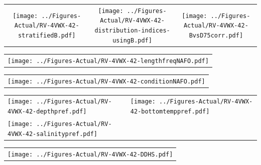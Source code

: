 \documentclass[12pt]{article}\usepackage[]{graphicx}\usepackage[]{color}
\begin{document}
\vspace{1cm}
\begin{minipage}{1.0\textwidth}
 \begin{tabular}{ccc}
\texttt{[image: ../Figures-Actual/RV-4VWX-42-stratifiedB.pdf]} & 
\texttt{[image: ../Figures-Actual/RV-4VWX-42-distribution-indices-usingB.pdf]} & 
\texttt{[image: ../Figures-Actual/RV-4VWX-42-BvsD75corr.pdf]} \\ 
\end{tabular} 
\end{minipage}
\clearpage
\begin{minipage}{1.0\textwidth}
 \begin{tabular}{c}
\texttt{[image: ../Figures-Actual/RV-4VWX-42-lengthfreqNAFO.pdf]} \\ 
\end{tabular} 
\end{minipage}
\newline

\vspace{1cm}
\begin{minipage}{1.0\textwidth}
 \begin{tabular}{c}
\texttt{[image: ../Figures-Actual/RV-4VWX-42-conditionNAFO.pdf]} \\ 
\end{tabular} 
\end{minipage}
\clearpage
\begin{minipage}{1.0\textwidth}
 \begin{tabular}[t]{m{3in}m{3in}}
\texttt{[image: ../Figures-Actual/RV-4VWX-42-depthpref.pdf]} & 
\texttt{[image: ../Figures-Actual/RV-4VWX-42-bottomtemppref.pdf]} \\ 
\texttt{[image: ../Figures-Actual/RV-4VWX-42-salinitypref.pdf]} & 
 \\ 
\end{tabular} 
\end{minipage}
\newline

\vspace{1cm}
\begin{minipage}{1.0\textwidth}
 \begin{tabular}{c}
\texttt{[image: ../Figures-Actual/RV-4VWX-42-DDHS.pdf]} \\ 
\end{tabular} 
\end{minipage}
\clearpage
\end{document}
